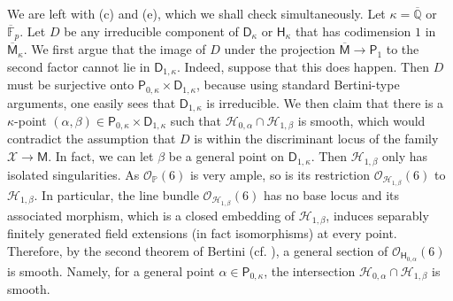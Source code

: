 \documentclass[11pt, letterpaper]{amsart}
\theoremstyle{plain}
\theoremstyle{definition}
\newcommand{\IF}{\mathbb{F}}
\newcommand{\IP}{\mathbb{P}}
\newcommand{\IQ}{\mathbb{Q}}
\newcommand{\<}{\langle}
\renewcommand{\>}{\rangle}
\newcommand{\sH}{\mathcal{H}}
\newcommand{\sO}{\mathcal{O}}
\newcommand{\sfD}{\mathsf{D}}
\newcommand{\sfM}{\mathsf{M}}
\newcommand{\sX}{\mathcal{X}}
\newcommand{\sfH}{\mathsf{H}}
\begin{document}
We are left with (c) and (e), which we shall check simultaneously. 
Let $\kappa = \overline{\IQ}$ or $\overline{\IF}_p$. 
Let $D$ be any irreducible component of $\sfD_{\kappa}$ or $\sfH_\kappa$ that has codimension $1$ in $\overline{\sfM}_\kappa$. 
We first argue that the image of $D$ under the projection $\overline{\sfM} \to \mathsf{P}_{1}$ to the second factor cannot lie in $\sfD_{1, \kappa}$. 
Indeed, suppose that this does happen. 
Then $D$ must be surjective onto $\mathsf{P}_{0, \kappa} \times \sfD_{1, \kappa}$, because using standard Bertini-type arguments, one easily sees that $\sfD_{1, \kappa}$ is irreducible. 
We then claim that there is a $\kappa$-point $(\alpha, \beta) \in \mathsf{P}_{0, \kappa} \times \sfD_{1, \kappa}$ such that $\sH_{0, \alpha} \cap \sH_{1, \beta}$ is smooth, which would contradict the assumption that $D$ is within the discriminant locus of the family $\sX\to \sfM$.
In fact, we can let $\beta$ be a general point on $\sfD_{1, \kappa}$. 
Then $\sH_{1, \beta}$ only has isolated singularities. 
As $\sO_{\IP}(6)$ is very ample, so is its restriction $\sO_{\sH_{1, \beta}}(6)$ to $\sH_{1, \beta}$. 
In particular, the line bundle $\sO_{\sH_{1, \beta}}(6)$ has no base locus and its associated morphism, which is a closed embedding of $\sH_{1, \beta}$, induces separably finitely generated field extensions (in fact isomorphisms) at every point. 
Therefore, by the second theorem of Bertini (cf. \cite[Cor.~2]{CGM86}), a general section of $\sO_{\sfH_{0, \alpha}}(6)$ is smooth. 
Namely, for a general point $\alpha \in \mathsf{P}_{0, \kappa}$, the intersection $\sH_{0, \alpha} \cap \sH_{1, \beta}$ is smooth. 
\end{document}
